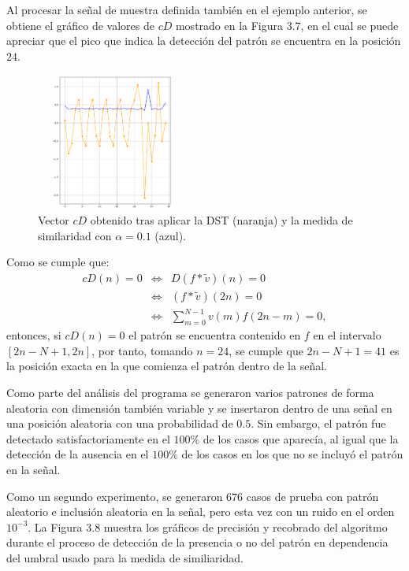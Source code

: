 \par Al procesar la se\~nal de muestra definida tambi\'en en el ejemplo anterior, se obtiene el gr\'afico de valores de $cD$ mostrado en la Figura 3.7, en el cual se puede apreciar que el pico que indica la detecci\'on del patr\'on se encuentra en la posici\'on $24$.

\begin{figure}[h]
\center
\includegraphics[width=50mm,height=45mm]{Graphics/patternDetected1D.png}
\caption{Vector $cD$ obtenido tras aplicar la DST (naranja) y la medida de similaridad con $\alpha=0.1$ (azul).}
\end{figure}

\par Como se cumple que:
\begin{eqnarray}
cD(n)=0&\Leftrightarrow& D(f\ast\tilde{v})(n)=0\nonumber\\
&\Leftrightarrow&(f\ast\tilde{v})(2n)=0\nonumber\\
&\Leftrightarrow&\sum_{m=0}^{N-1}v(m)f(2n-m)=0,\nonumber
\end{eqnarray}
entonces, si $cD(n)=0$ el patr\'on se encuentra contenido en $f$ en el intervalo $[2n-N+1,2n]$, por tanto, tomando $n=24$, se cumple que $2n-N+1=41$ es la posici\'on exacta en la que comienza el patr\'on dentro de la se\~nal.

\par Como parte del an\'alisis del programa se generaron varios patrones de forma aleatoria con dimensi\'on tambi\'en variable y se insertaron dentro de una se\~nal en una posici\'on aleatoria con una probabilidad de $0.5$. Sin embargo, el patr\'on fue detectado satisfactoriamente en el $100\%$ de los casos que aparec\'ia, al igual que la detecci\'on de la ausencia en el $100\%$ de los casos en los que no se incluy\'o el patr\'on en la se\~nal.\\

\par Como un segundo experimento, se generaron $676$ casos de prueba con patr\'on aleatorio e inclusi\'on aleatoria en la se\~nal, pero esta vez con un ruido en el orden $10^{-3}$.  La Figura 3.8 muestra los gr\'aficos de precisi\'on y recobrado del algoritmo durante el proceso de detecci\'on de la presencia o no del patr\'on en dependencia del umbral usado para la medida de similiaridad.

